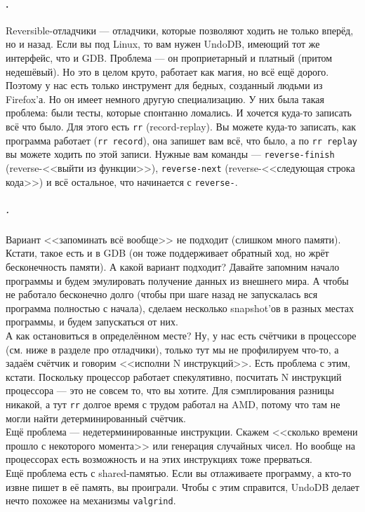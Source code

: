 \documentclass{article}
\begin{document}
    \paragraph{.}
    Reversible-отладчики --- отладчики, которые позволяют ходить не только вперёд, но и назад. Если вы под Linux, то вам нужен UndoDB, имеющий тот же интерфейс, что и GDB. Проблема --- он проприетарный и платный (притом недешёвый). Но это в целом круто, работает как магия, но всё ещё дорого. Поэтому у нас есть только инструмент для бедных, созданный людьми из Firefox'а. Но он имеет немного другую специализацию. У них была такая проблема: были тесты, которые спонтанно ломались. И хочется куда-то записать всё что было. Для этого есть \texttt{rr} (record-replay). Вы можете куда-то записать, как программа работает (\texttt{rr record}), она запишет вам всё, что было, а по \texttt{rr replay} вы можете ходить по этой записи. Нужные вам команды --- \texttt{reverse-finish} (reverse-<<выйти из функции>>), \texttt{reverse-next} (reverse-<<следующая строка кода>>) и всё остальное, что начинается с \texttt{reverse-}.
    \subparagraph{.}
    Вариант <<запоминать всё вообще>> не подходит (слишком много памяти). Кстати, такое есть и в GDB (он тоже поддерживает обратный ход, но жрёт бесконечность памяти). А какой вариант подходит? Давайте запомним начало программы и будем эмулировать получение данных из внешнего мира. А чтобы не работало бесконечно долго (чтобы при шаге назад не запускалась вся программа полностью с начала), сделаем несколько snapshot'ов в разных местах программы, и будем запускаться от них.\\
    А как остановиться в определённом месте? Ну, у нас есть счётчики в процессоре (см. ниже в разделе про отладчики), только тут мы не профилируем что-то, а задаём счётчик и говорим <<исполни N инструкций>>. Есть проблема с этим, кстати. Поскольку процессор работает спекулятивно, посчитать N инструкций процессора --- это не совсем то, что вы хотите. Для сэмплирования разницы никакой, а тут \texttt{rr} долгое время с трудом работал на AMD, потому что там не могли найти детерминированный счётчик.\\
    Ещё проблема --- недетерминированные инструкции. Скажем <<сколько времени прошло с некоторого момента>> или генерация случайных чисел. Но вообще на процессорах есть возможность и на этих инструкциях тоже прерваться.\\
    Ещё проблема есть с shared-памятью. Если вы отлаживаете программу, а кто-то извне пишет в её память, вы проиграли. Чтобы с этим справится, UndoDB делает нечто похожее на механизмы \texttt{valgrind}.
\end{document}
